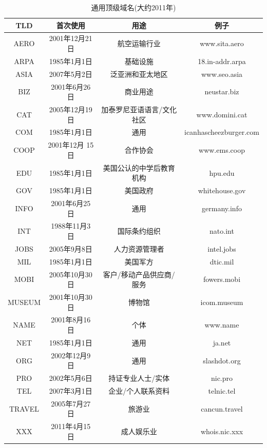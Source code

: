 \begin{table}[]
  \centering
  \caption{通用顶级域名(大约2011年)}
  \begin{tabular}{c|c|c|c}
    \hline
    TLD      & 首次使用      &     用途            &              例子 \\ \hline
    AERO  & 2001年12月21日  & 航空运输行业         &     www.sita.aero \\ \hline
    ARPA  & 1985年1月1日  & 基础设施             &     18.in-addr.arpa \\ \hline
    ASIA  & 2007年5月2日  & 泛亚洲和亚太地区         & www.seo.asia \\ \hline
    BIZ      & 2001年6月26日  & 商业用途            &      neustar.biz \\ \hline
    CAT      & 2005年12月19日  & 加泰罗尼亚语语言/文化社区  &www.domini.cat \\ \hline
    COM      & 1985年1月1日  & 通用               &
    icanhascheezburger.com \\ \hline
    COOP  & 2001年12月 15日  & 合作协会          &        www.ems.coop \\ \hline
    EDU      & 1985年1月1日  & 美国公认的中学后教育机构     & hpu.edu \\ \hline
    GOV      & 1985年1月1日  & 美国政府             &     whitehouse.gov \\ \hline
    INFO  & 2001年6月25日  & 通用              &        germany.info \\ \hline
    INT      & 1988年11月3日  & 国际条约组织          &    nato.int \\ \hline
    JOBS  & 2005年9月8日  & 人力资源管理者          &    intel.jobs \\ \hline
    MIL      & 1985年1月1日  & 美国军方             &     dtic.mil \\ \hline
    MOBI  & 2005年10月30日  & 客户/移动产品供应商/服务  &fowers.mobi \\ \hline
    MUSEUM  & 2001年10月30日  & 博物馆            &      icom.museum \\ \hline
    NAME  & 2001年8月16日  & 个体              &    www.name \\ \hline
    NET      & 1985年1月1日  & 通用               &   ja.net \\ \hline
    ORG      & 2002年12月9日  & 通用              &    slashdot.org \\ \hline
    PRO      & 2002年5月6日  & 持证专业人士/实体        &  nic.pro \\ \hline
    TEL      & 2007年3月1日  & 企业/个人联系资料        &  telnic.tel \\ \hline
    TRAVEL  & 2005年7月27日  & 旅游业             &     cancun.travel \\ \hline
    XXX  & 2011年4月15日  & 成人娱乐业            &      whois.nic.xxx \\ \hline
  \end{tabular}
\end{table}

